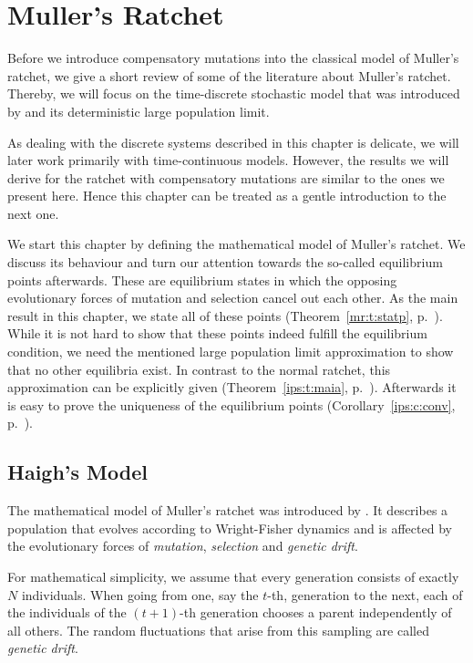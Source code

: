 \chapter{Muller's Ratchet}

Before we introduce compensatory mutations into the classical model of Muller's
ratchet, we give a short review of some of the literature about Muller's
ratchet. Thereby, we will focus on the time-discrete stochastic model that was
introduced by \cite{haigh_accumulation_1978} and its deterministic large
population limit.

As dealing with the discrete systems described in this chapter is
delicate, we will later work primarily with time-continuous models.
However, the results we will derive for the ratchet with compensatory mutations are
similar to the ones we present here. Hence this chapter can be treated as a
gentle introduction to the next one. 

We start this chapter by defining the mathematical model of Muller's ratchet. We
discuss its behaviour and turn our attention towards the so-called equilibrium
points afterwards. These are equilibrium states in which the opposing evolutionary
forces of mutation and selection cancel out each other. As the main result in
this chapter, we state all of these points (Theorem~\ref{mr:t:statp},
p.~\pageref{mr:t:statp}). While it is not hard to show that these points
indeed fulfill the equilibrium condition, we need the mentioned large
population limit approximation to show that no other equilibria exist. In
contrast to the normal ratchet, this approximation can be explicitly given
(Theorem~\ref{ips:t:maia}, p.~\pageref{ips:t:maia}). Afterwards it is
easy to prove the uniqueness of the equilibrium points
(Corollary~\ref{ips:c:conv}, p.~\pageref{ips:c:conv}).

\section{Haigh's Model}
The mathematical model of Muller's ratchet was introduced by \citet{haigh_accumulation_1978}. It 
describes a population that evolves according to Wright-Fisher dynamics and is affected by the
evolutionary forces of \emph{mutation}, \emph{selection} and \emph{genetic drift}.

For mathematical simplicity, we assume that every generation consists of exactly $N$
individuals. When going from one, say the $t$-th, generation to the next, each of the individuals of
the $(t+1)$-th generation chooses a parent independently of all others. The
random fluctuations that arise from this sampling are called \emph{genetic drift}.

